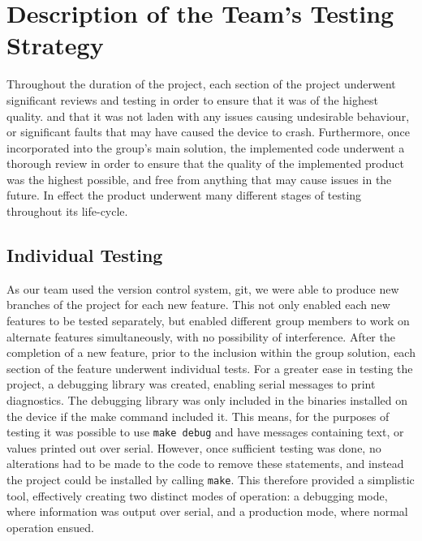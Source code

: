 \section{Description of the Team's Testing Strategy}

Throughout the duration of the project, each section of the project underwent 
significant reviews and testing in order to ensure that it was of the highest 
quality.
and that it was not laden with any issues causing undesirable behaviour, 
or significant faults that may have caused the device to crash. Furthermore, once 
incorporated into the group's main solution, the implemented code underwent a 
thorough review in order to ensure that the quality of the implemented product 
was the highest possible, and free from anything that may cause issues in the 
future. In effect the product underwent many different stages of testing 
throughout its life-cycle. 

\subsection*{Individual Testing}

As our team used the version control system, git, we were able to produce new 
branches of the project for each new feature. 
This not only enabled each new features to be tested separately, but enabled 
different group members to work on alternate features simultaneously, with no 
possibility of interference. 
After the completion of a new feature, prior to the inclusion within the group 
solution, each section of the feature underwent individual tests. 
For a greater ease in testing the project,  a debugging library was created, 
enabling serial messages to print diagnostics. 
The debugging library was only included in the 
binaries installed on the device if the make command included it. This 
means, for the purposes of testing it was possible to use \texttt{make debug} 
and have messages containing text, or values printed out over serial. 
However, once sufficient testing was done, no 
alterations had to be made to the code to remove these statements, and 
instead the project could be installed by calling \texttt{make}. 
This therefore provided a simplistic tool, effectively creating two distinct 
modes of operation: a debugging mode, where information was output over serial, 
and a production mode, where normal operation ensued. 

